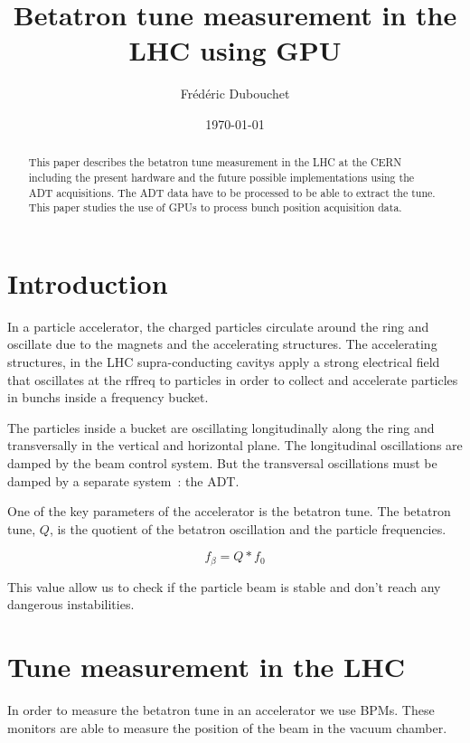 \documentclass[a4paper]{article}
\title{Betatron tune measurement in the LHC using GPU}
\author{Fr\'ed\'eric Dubouchet}
\date{\today}
\begin{document}
\maketitle
\tableofcontents

\begin{abstract}
This paper describes the betatron tune measurement in the \gls{LHC} at the
\gls{CERN} including the present hardware and the future possible 
implementations using the \gls{ADT} acquisitions. The \gls{ADT} data have to 
be processed to be able to extract the \gls{tune}. This paper studies the use
of \glspl{GPU} to process \gls{bunch} position acquisition data.
\end{abstract}

\clearpage

\section{Introduction}

In a particle accelerator, the charged particles circulate around the ring
and oscillate due to the magnets and the accelerating structures. The 
accelerating structures, in the \gls{LHC} supra-conducting \glspl{cavity} 
apply a strong electrical field that oscillates at the \gls{rffreq} 
to particles in order to collect and accelerate particles in \glspl{bunch} 
inside a frequency \gls{bucket}.

The particles inside a bucket are oscillating longitudinally along the 
ring and transversally in the vertical and horizontal plane. The longitudinal
oscillations are damped by the beam control system. But the transversal
oscillations must be damped by a separate system~: the 
\gls{ADT}\cite{Benews11,Zhabitsky:1141925}.

One of the key parameters of the accelerator is the betatron tune. The 
betatron tune, $Q$, is the quotient of the betatron oscillation and the 
particle frequencies.

$$f_\beta = Q * f_0$$

This value allow us to check if the particle beam is stable and don't reach
any dangerous instabilities.

\section{Tune measurement in the LHC}

In order to measure the betatron tune in an accelerator we use \glspl{BPM}.
These monitors are able to measure the position of the beam in the vacuum 
chamber.
\end{document}
